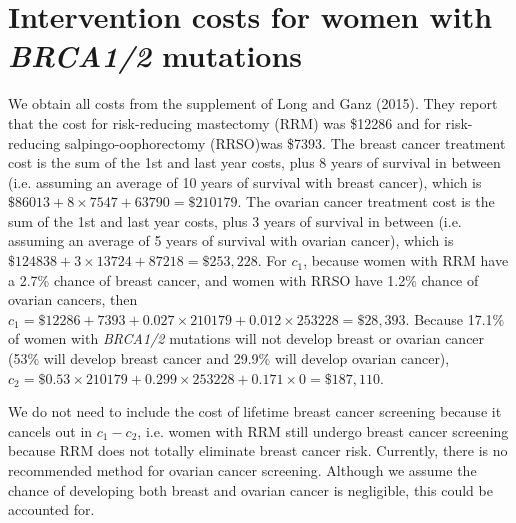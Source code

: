 \documentclass[AMA,STIX1COL]{WileyNJD-v2}
\begin{document}

\section{Intervention costs for women with \textit{BRCA1/2} mutations}
\label{sec:TreatmentCostsBRCA}
We obtain all costs from the supplement of Long and Ganz (2015).  They report that the cost for risk-reducing mastectomy (RRM) was \$12286 and for risk-reducing salpingo-oophorectomy (RRSO)was \$7393.  The breast cancer treatment cost is the sum of the 1st and last year costs, plus 8 years of survival in between (i.e. assuming an average of 10 years of survival with breast cancer), which is $\$86013+8\times 7547+63790=\$210179$.  The ovarian cancer treatment cost is the sum of the 1st and last year costs, plus 3 years of survival in between (i.e. assuming an average of 5 years of survival with ovarian cancer), which is $\$124838+3\times 13724+87218=\$253,228$.    For $c_1$, because women with RRM have a 2.7\% chance of breast cancer, and women with RRSO have 1.2\% chance of ovarian cancers, then $c_1=\$12286+7393 + 0.027\times 210179 + 0.012\times 253228 = \$28,393$.  Because 17.1\% of women with \textit{BRCA1/2} mutations will not develop breast or ovarian cancer (53\% will develop breast cancer and 29.9\% will develop ovarian cancer), $c_2=\$0.53\times 210179+0.299\times 253228+ 0.171\times 0 = \$187,110$.

We do not need to include the cost of lifetime breast cancer screening because it cancels out in $c_1-c_2$, i.e. women with RRM still undergo breast cancer screening because RRM does not totally eliminate breast cancer risk.  Currently, there is no recommended method for ovarian cancer screening.  Although we assume the chance of developing both breast and ovarian cancer is negligible, this could be accounted for.

\end{document}
